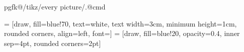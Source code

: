 %
\newif\iftr     %
\newif\ifall    %
\newif\ifconf   %
\newif\ifsq     %
\newif\ifnonb   %
\newif\iftodos

\newif\ifsqCAP
\newif\ifsqVS
\newif\ifsqEN
\newif\ifsqTIT

\sqtrue
\sqCAPtrue
\sqENtrue
\sqVStrue
\sqTITtrue

\sqCAPfalse



\newcommand{\tr}[1]{\iftr #1 \fi}
\newcommand{\all}[1]{\ifall #1 \fi}
\newcommand{\cnf}[1]{\ifconf #1 \fi}



%
\usepackage{etex}
\usepackage{balance}
\usepackage{epstopdf}
\usepackage{placeins}



%
\usepackage{cite}



%
\usepackage{graphicx}
\usepackage{float}
\usepackage{dblfloatfix}
\usepackage{multirow}
\usepackage{rotating}
\usepackage[switch]{lineno} %
\usepackage{makecell}
\usepackage{tabulary}
\usepackage{parcolumns}
\usepackage{tikz}
\usetikzlibrary{tikzmark}

%
\usepackage{xpatch}
\expandafter\xpatchcmd
\csname pgfk@/tikz/every picture/.@cmd\endcsname
{\thepage}{}{}{}

%
 = [draw, fill=blue!70, text=white, text width=3cm, minimum height=1cm, rounded corners, align=left, font=\scriptsize]
 = [draw, fill=blue!20, opacity=0.4, inner sep=4pt, rounded corners=2pt]

\usetikzlibrary{shapes}
\usetikzlibrary{plotmarks}
\usetikzlibrary{calc, fit}

\let\labelindent\relax
\usepackage{enumitem}



%
\usepackage{amsthm}
\usepackage{amsmath,amssymb,amsfonts}
\usepackage{mathtools,mathrsfs}

